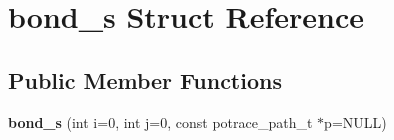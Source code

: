 \hypertarget{structbond__s}{\section{bond\-\_\-s Struct Reference}
\label{structbond__s}
}
\subsection*{Public Member Functions}
\begin{DoxyCompactItemize}
\item 
\hypertarget{structbond__s_aad689833a5cade02d828a3cb6a65b993}{{\bfseries bond\-\_\-s} (int i=0, int j=0, const potrace\-\_\-path\-\_\-t $\ast$p=N\-U\-L\-L)}\label{structbond__s_aad689833a5cade02d828a3cb6a65b993}

\end{DoxyCompactItemize}
